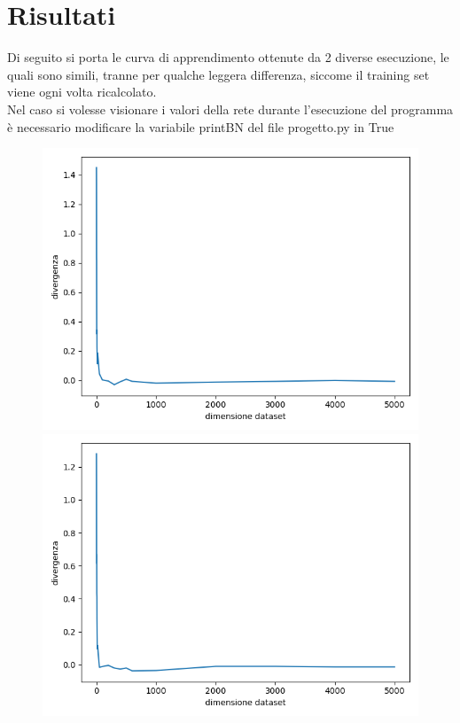 \documentclass[14pt]{extarticle}
\begin{document}
	\section{Risultati}
	Di seguito si porta le curva di apprendimento ottenute da 2 diverse esecuzione, le quali sono simili, tranne per qualche leggera differenza, siccome il training set viene ogni volta ricalcolato.\\
	Nel caso si volesse visionare  i valori della rete durante l'esecuzione del programma è necessario modificare la variabile printBN del file progetto.py in True\
	\begin{figure}[t]
	\includegraphics[scale=0.8]{Figure_1.png}\\
	\includegraphics[scale=0.8]{Figure_2.png}\\
	\centering
	\end{figure}
	
\end{document}

